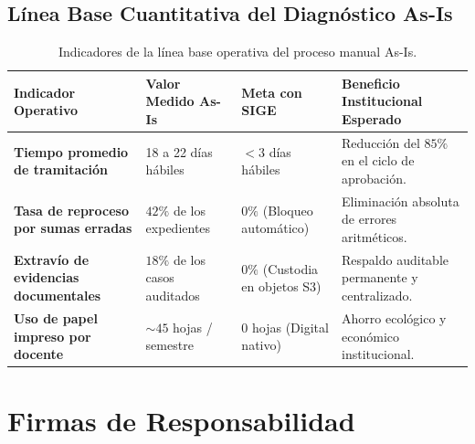 \documentclass[12pt,a4paper]{article}
\begin{document}
\subsection{Línea Base Cuantitativa del Diagnóstico As-Is}
\begin{table}[H]
\centering
\small
\renewcommand{\arraystretch}{1.2}
\begin{tabularx}{\textwidth}{|>{\hsize=1.1\hsize\raggedright\arraybackslash\bfseries\footnotesize}X|>{\hsize=0.45\hsize\centering\arraybackslash\footnotesize}X|>{\hsize=0.45\hsize\centering\arraybackslash\footnotesize}X|>{\hsize=2.0\hsize\raggedright\arraybackslash\footnotesize}X|}
\hline
\rowcolor{tableheader}
\textbf{Indicador Operativo} & \textbf{Valor Medido As-Is} & \textbf{Meta con SIGE} & \textbf{Beneficio Institucional Esperado} \\
\hline
Tiempo promedio de tramitación & 18 a 22 días hábiles & $<3$ días hábiles & Reducción del $85\%$ en el ciclo de aprobación. \\
\hline
Tasa de reproceso por sumas erradas & $42\%$ de los expedientes & $0\%$ (Bloqueo automático) & Eliminación absoluta de errores aritméticos. \\
\hline
Extravío de evidencias documentales & $18\%$ de los casos auditados & $0\%$ (Custodia en objetos S3) & Respaldo auditable permanente y centralizado. \\
\hline
Uso de papel impreso por docente & $\sim 45$ hojas / semestre & $0$ hojas (Digital nativo) & Ahorro ecológico y económico institucional. \\
\hline
\end{tabularx}
\caption{Indicadores de la línea base operativa del proceso manual As-Is.}
\end{table}

\section{Firmas de Responsabilidad}
\end{document}

